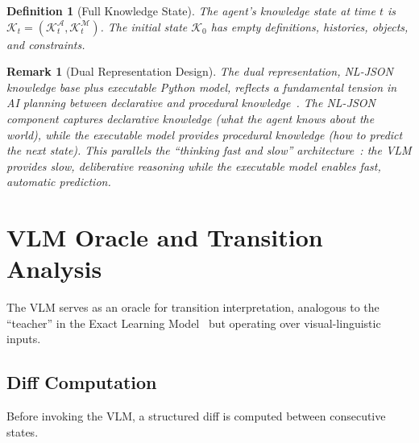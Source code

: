 \documentclass{article}
\newtheorem{definition}{Definition}
\newtheorem{remark}{Remark}
\newcommand{\calA}{\mathcal{A}}
\newcommand{\calK}{\mathcal{K}}
\newcommand{\calM}{\mathcal{M}}
\begin{document}
\begin{definition}[Full Knowledge State]
\label{def:full_knowledge}
The agent's knowledge state at time $t$ is $\calK_t = (\calK^{\calA}_t, \calK^{\calM}_t)$.  The initial state $\calK_0$ has empty definitions, histories, objects, and constraints.
\end{definition}

\begin{remark}[Dual Representation Design]
\label{rem:dual}
The dual representation, NL-JSON knowledge base plus executable Python model, reflects a fundamental tension in AI planning between \emph{declarative} and \emph{procedural} knowledge~\cite{ghallab2004automated}.  The NL-JSON component captures declarative knowledge (what the agent knows about the world), while the executable model provides procedural knowledge (how to predict the next state).  This parallels the ``thinking fast and slow'' architecture~\cite{kahneman2011thinking}: the VLM provides slow, deliberative reasoning while the executable model enables fast, automatic prediction.
\end{remark}



\section{VLM Oracle and Transition Analysis}
\label{sec:vlm_oracle}

The VLM serves as an oracle for transition interpretation, analogous to the ``teacher'' in the Exact Learning Model~\cite{angluin1987learning} but operating over visual-linguistic inputs.

\subsection{Diff Computation}
\label{sec:diff}

Before invoking the VLM, a structured diff is computed between consecutive states.
\end{document}
